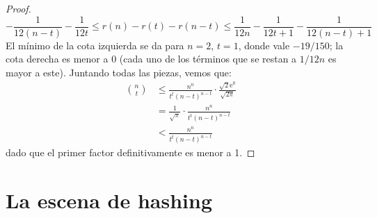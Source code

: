 \begin{proof}
\begin{equation*}
        - \frac{1}{12 (n - t)}
        - \frac{1}{12 t}
        \le r(n) - r(t) - r(n - t)
        \le \frac{1}{12 n}
               - \frac{1}{12 t + 1}
               - \frac{1}{12 (n - t) + 1}
    \end{equation*}
    El mínimo de la cota izquierda se da para \(n = 2\), \(t = 1\),
    donde vale \(-19/150\);
    la cota derecha es menor a \num{0}
    (cada uno de los términos que se restan a \(1 / 12 n\)
     es mayor a este).
    Juntando todas las piezas,
    vemos que:
    \begin{align*}
      \binom{n}{t}
        &\le \frac{n^n}{t^t (n - t)^{n - t}}
               \cdot \frac{\sqrt{2} \mathrm{e}^{0}}{\sqrt{2 \pi}} \\
        &=   \frac{1}{\sqrt{\pi}} \cdot \frac{n^n}{t^t (n - t)^{n - t}} \\
        &<   \frac{n^n}{t^t (n - t)^{n - t}}
    \end{align*}
    dado que el primer factor definitivamente es menor a \num{1}.
  \end{proof}

\section{La escena de hashing}
\label{sec:escena-hashing}

